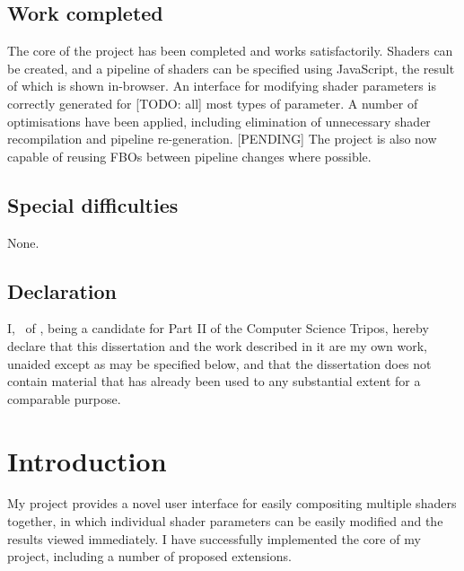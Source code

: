 \documentclass[12pt,twoside,notitlepage]{report}
\begin{document}
\section*{Work completed}
The core of the project has been completed and works satisfactorily. Shaders can be created, and a pipeline of shaders can be specified using JavaScript, the result of which is shown in-browser. An interface for modifying shader parameters is correctly generated for [TODO: all] most types of parameter. A number of optimisations have been applied, including elimination of unnecessary shader recompilation and pipeline re-generation. [PENDING] The project is also now capable of reusing FBOs between pipeline changes where possible.

\section*{Special difficulties}
None.
 
\newpage
\section*{Declaration}

I, \name \ of \college, being a candidate for Part II of the Computer
Science Tripos, hereby declare
that this dissertation and the work described in it are my own work,
unaided except as may be specified below, and that the dissertation
does not contain material that has already been used to any substantial
extent for a comparable purpose.

\bigskip
{}

\medskip
{}

\cleardoublepage

\tableofcontents


\cleardoublepage        %

\setcounter{page}{1}
\pagestyle{headings}

\chapter{Introduction}
My project provides a novel user interface for easily compositing multiple shaders together, in which individual shader parameters can be easily modified and the results viewed immediately. I have successfully implemented the core of my project, including a number of proposed extensions.
\end{document}

